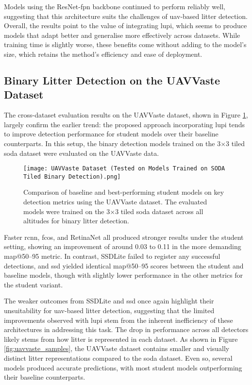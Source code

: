 Models using the ResNet-\gls{fpn} backbone continued to perform reliably well, suggesting that this architecture suits the challenges of \gls{uav}-based litter detection. Overall, the results point to the value of integrating \gls{lupi}, which seems to produce models that adapt better and generalise more effectively across datasets. While training time is slightly worse, these benefits come without adding to the model’s size, which retains the method's efficiency and ease of deployment.


\subsection{Binary Litter Detection on the UAVVaste Dataset}
\label{subsec:5_uavvaste_exp}

The cross-dataset evaluation results on the UAVVaste dataset, shown in Figure \ref{fig:uavvaste_bar}, largely confirm the earlier trend: the proposed approach incorporating \gls{lupi} tends to improve detection performance for student models over their baseline counterparts. In this setup, the binary detection models trained on the 3$\times$3 tiled \gls{soda} dataset were evaluated on the UAVVaste data.

\begin{figure}[!ht]
    \centering
    \texttt{[image: UAVVaste Dataset (Tested on Models Trained on SODA Tiled Binary Detection).png]}
    \caption{Comparison of baseline and best-performing student models on key detection metrics using the UAVVaste dataset. The evaluated models were trained on the 3$\times$3 tiled \gls{soda} dataset across all altitudes for binary litter detection.}
    \label{fig:uavvaste_bar}
\end{figure}

Faster \gls{rcnn}, \gls{fcos}, and RetinaNet all produced stronger results under the student setting, showing an improvement of around 0.03 to 0.11 in the more demanding \gls{map}@50--95 metric. In contrast, SSDLite failed to register any successful detections, and \gls{ssd} yielded identical \gls{map}@50--95 scores between the student and baseline models, though with slightly lower performance in the other metrics for the student variant.

The weaker outcomes from SSDLite and \gls{ssd} once again highlight their unsuitability for \gls{uav}-based litter detection, suggesting that the limited improvements observed with \gls{lupi} stem from the inherent inefficiency of these architectures in addressing this task.
The drop in performance across all detectors likely stems from how litter is represented in each dataset. As shown in Figure \ref{fig:uavvaste_samples}, the UAVVaste dataset contains smaller and visually distinct litter representations compared to the \gls{soda} dataset. Even so, several models produced accurate predictions, with most student models outperforming their baseline counterparts.

